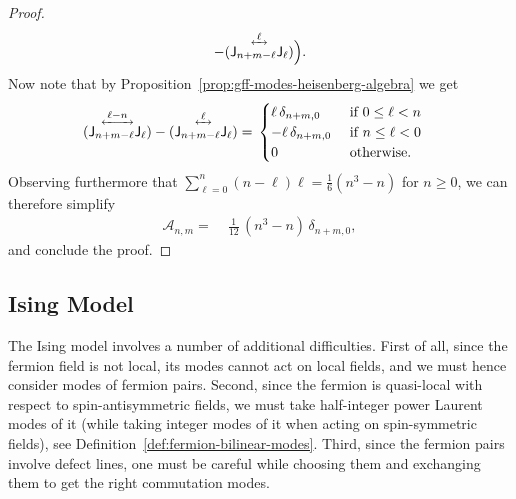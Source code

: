 \documentclass[12pt,oneside,english]{amsart}
\numberwithin{equation}{section}
\numberwithin{figure}{section}
\theoremstyle{plain}
\theoremstyle{plain}
\theoremstyle{plain}
\theoremstyle{plain}
\theoremstyle{remark}
\theoremstyle{definition}
\theoremstyle{plain}
\theoremstyle{plain}
\numberwithin{thm}{section}
\newcommand{\kallemod}[1]{{\color{kallecol} {#1}}}
\begin{document}
\begin{proof}
\[	- \ourorder{\currmode{n+m-\ell}}{\currmode{\ell}}{\ell} \Big) .
\]
Now note that by Proposition~\ref{prop:gff-modes-heisenberg-algebra} we get
\begin{align*}
\ourorder{\currmode{n+m-\ell}}{\currmode{\ell}}{\ell-n}
	- \ourorder{\currmode{n+m-\ell}}{\currmode{\ell}}{\ell}
= \; & \begin{cases}
       \ell \, \delta_{n+m,0} & \text{ if } 0 \leq \ell < n \\
       -\ell \, \delta_{n+m,0} & \text{ if } n \leq \ell < 0 \\
       0 & \text{ otherwise} .
       \end{cases}
\end{align*}
Observing furthermore that
$\sum_{\ell=0}^{n} (n-\ell) \ell = \frac{1}{6}(n^3-n)$ for $n\geq0$, we can 
therefore simplify
\begin{align*}
\mathcal{A}_{n,m} 
= \; & \frac{1}{12} \, (n^3-n) \, \delta_{n+m,0} ,
\end{align*}
and conclude the proof.
\end{proof}



\subsection{Ising Model}


The Ising model involves a number of additional difficulties. First
of all, since the fermion field is not local, its modes cannot act
on local fields, and we must hence consider modes of fermion pairs.
Second, since the fermion is quasi-local with respect to spin-antisymmetric
fields, we must take half-integer power Laurent
modes of it (while taking integer
modes of it when acting on spin-symmetric fields),
see Definition~\ref{def:fermion-bilinear-modes}. Third, since the
fermion pairs involve defect lines, one must be careful while choosing
them and exchanging them to get the right commutation modes.
\end{document}
